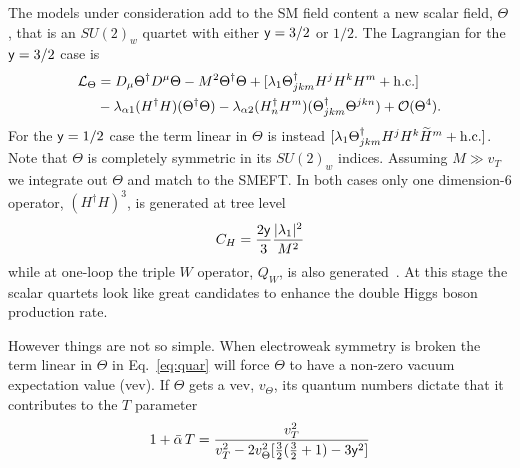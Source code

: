 The models under consideration add to the SM field content a new scalar field, $\Theta$, that is an $SU(2)_w$ quartet with either $\mathsf{y} = 3/2$ or $1/2$. 
The Lagrangian for the $\mathsf{y} = 3/2$ case is
\begin{align}
\label{eq:quar}
\mathcal{L}_\Theta &= D_\mu \Theta^\dag D^\mu \Theta - M^2 \Theta^\dag \Theta  + [\lambda_1 \Theta_{jkm}^\dag H^j H^k H^m + \mathrm{h.c.}] \nonumber\\ 
&- \lambda_{\alpha1} (H^\dag H) (\Theta^\dag \Theta)  - \lambda_{\alpha2} (H_n^\dag H^m) (\Theta_{jkm}^\dag \Theta^{jkn})  + \mathcal{O}(\Theta^4) .
\end{align}
For the $\mathsf{y} = 1/2$ case the term linear in $\Theta$ is instead $[\lambda_1 \Theta_{jkm}^\dag H^j H^k \widetilde H^m + \mathrm{h.c.}]$.
Note that $\Theta$ is completely symmetric in its $SU(2)_w$ indices.
Assuming $M \gg v_T$ we integrate out $\Theta$ and match to the SMEFT.
In both cases only one dimension-6 operator, $(H^\dag H)^3$, is generated  at tree level~\cite{Henning:2014wua, Dawson:2017vgm, deBlas:2017xtg}
\begin{equation}
C_H = \frac{2\mathsf{y}}{3} \frac{|\lambda_1|^2}{M^2} 
\end{equation}
while at one-loop the triple $W$ operator, $Q_W$, is also generated~\cite{Henning:2014wua, Bakshi:2018ics}.
At this stage the scalar quartets look like great candidates to enhance the double Higgs boson production rate.

However things are not so simple.
When electroweak symmetry is broken the term linear in $\Theta$ in Eq.~\eqref{eq:quar} will force $\Theta$ to have a non-zero vacuum expectation value (vev).
If $\Theta$ gets a vev, $v_\Theta$, its quantum numbers dictate that it contributes to the $T$ parameter~\cite{Dawson:2017vgm}
\begin{equation}
1 + \bar\alpha\, T = \frac{v_T^2}{v_T^2 - 2 v_\Theta^2 [\tfrac{3}{2} (\tfrac{3}{2} + 1) - 3 \mathsf{y}^2]} 
\end{equation}

